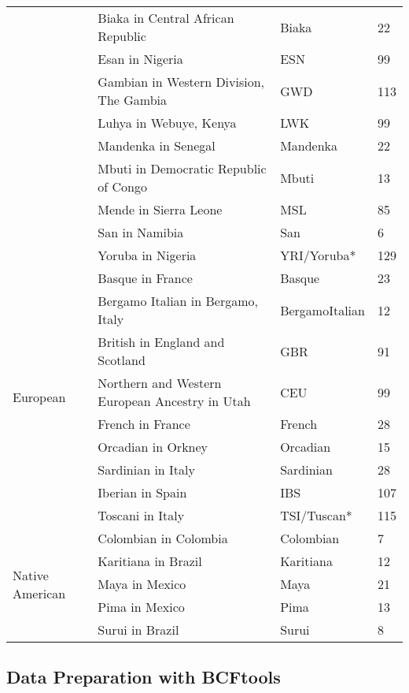 \documentclass[11pt]{article}
\begin{document}
\begin{table}[htb]
\begin{tabular}{ |p{3cm}||p{8cm}|p{3cm}|p{0.8cm}|  }
        &Biaka in Central African Republic & Biaka & 22 \\
        &Esan in Nigeria & ESN & 99 \\
        &Gambian in Western Division, The Gambia & GWD & 113 \\
        &Luhya in Webuye, Kenya & LWK & 99 \\
        &Mandenka in Senegal & Mandenka & 22 \\
        &Mbuti in Democratic Republic of Congo & Mbuti & 13 \\
        &Mende in Sierra Leone & MSL & 85 \\
        &San in Namibia & San & 6 \\
        &Yoruba in Nigeria & YRI/Yoruba* & 129 \\
    \hline
    \multirow{9}{*}{European}
        &Basque in France & Basque & 23 \\
        &Bergamo Italian in Bergamo, Italy & BergamoItalian & 12 \\
        &British in England and Scotland & GBR & 91 \\
        &Northern and Western European Ancestry in Utah & CEU & 99 \\
        &French in France & French & 28 \\
        &Orcadian in Orkney & Orcadian & 15 \\
        &Sardinian in Italy & Sardinian & 28 \\
        &Iberian in Spain & IBS & 107 \\
        &Toscani in Italy & TSI/Tuscan* & 115 \\
    \hline
    \multirow{5}{*}{Native American}
        &Colombian in Colombia & Colombian & 7 \\
        &Karitiana in Brazil & Karitiana & 12 \\
        &Maya in Mexico & Maya & 21 \\
        &Pima in Mexico & Pima & 13 \\
        &Surui in Brazil & Surui & 8 \\
    \hline
    \end{tabular}
\end{table}





\subsection{Data Preparation with BCFtools}
\end{document}
